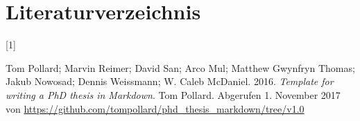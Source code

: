 \documentclass[listof=totoc,index=totoc,bibliography=totoc,12pt,ngerman,a4paper,]{report}
\newlength{\cslhangindent}
\newlength{\csllabelwidth}
\newenvironment{CSLReferences}[2] %
 {%
  \setlength{\parindent}{0pt}
  \ifodd #1 \everypar{\setlength{\hangindent}{\cslhangindent}}\ignorespaces\fi
  \ifnum #2 > 0
  \setlength{\parskip}{#2\baselineskip}
  \fi
 }%
 {}
\newcommand{\CSLLeftMargin}[1]{\parbox[t]{\csllabelwidth}{#1}}
\newcommand{\CSLRightInline}[1]{\parbox[t]{\linewidth - \csllabelwidth}{#1}\break}
\begin{document}
\chapter{Literaturverzeichnis}\label{literaturverzeichnis}


\hypertarget{refs}{}
\begin{CSLReferences}{0}{0}
\leavevmode{}%
\CSLLeftMargin{{[}1{]} }%
\CSLRightInline{Tom Pollard; Marvin Reimer; David San; Arco Mul; Matthew
Gwynfryn Thomas; Jakub Nowosad; Dennis Weissmann; W. Caleb McDaniel.
2016. \emph{Template for writing a PhD thesis in Markdown}. Tom Pollard.
Abgerufen 1. November 2017 von
\url{https://github.com/tompollard/phd_thesis_markdown/tree/v1.0}}

\end{CSLReferences}
\end{document}
